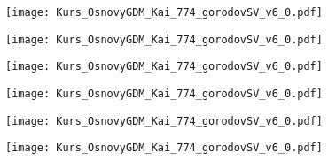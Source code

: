 \documentclass[main.tex]{subfiles}
\begin{document}
\texttt{[image: Kurs\_OsnovyGDM\_Kai\_774\_gorodovSV\_v6\_0.pdf]}

\texttt{[image: Kurs\_OsnovyGDM\_Kai\_774\_gorodovSV\_v6\_0.pdf]}

\texttt{[image: Kurs\_OsnovyGDM\_Kai\_774\_gorodovSV\_v6\_0.pdf]}

\texttt{[image: Kurs\_OsnovyGDM\_Kai\_774\_gorodovSV\_v6\_0.pdf]}

\texttt{[image: Kurs\_OsnovyGDM\_Kai\_774\_gorodovSV\_v6\_0.pdf]}

\texttt{[image: Kurs\_OsnovyGDM\_Kai\_774\_gorodovSV\_v6\_0.pdf]}
\end{document}
